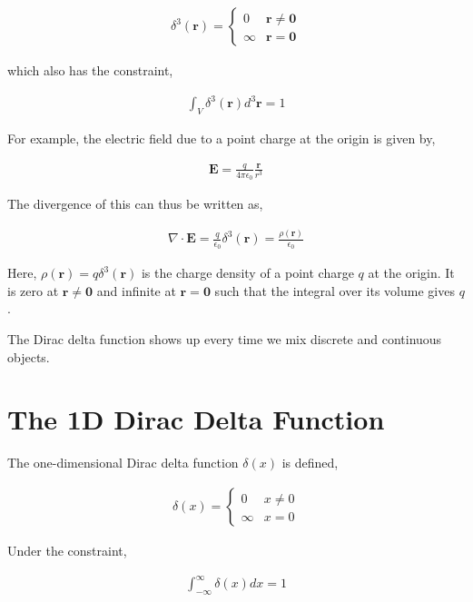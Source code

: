 \documentclass[11pt]{amsart}
\begin{document}
\begin{align*}
  \delta^3(\mathbf{r}) =
  \begin{cases}
    0 & \mathbf{r} \neq \mathbf{0} \\
    \infty & \mathbf{r} = \mathbf{0}
  \end{cases}
\end{align*}

which also has the constraint,

\begin{align*}
  \int_V \delta^3(\mathbf{r}) d^3\mathbf{r} = 1
\end{align*}

For example, the electric field due to a point charge at the origin is given by,

\begin{align*}
  \mathbf{E} = \frac{q}{4\pi\epsilon_0} \frac{\mathbf{r}}{r^3}
\end{align*}

The divergence of this can thus be written as,

\begin{align*}
  \nabla\cdot\mathbf{E} = \frac{q}{\epsilon_0}\delta^3(\mathbf{r}) = \frac{\rho(\mathbf{r})}{\epsilon_0}
\end{align*}

Here, $\rho(\mathbf{r}) = q\delta^3(\mathbf{r})$ is the charge density of a point charge $q$ at the origin. It is zero at $\mathbf{r} \neq \mathbf{0}$ and infinite at $\mathbf{r} = \mathbf{0}$ such that the integral over its volume gives $q$.

The Dirac delta function shows up every time we mix discrete and continuous objects.

\section{The 1D Dirac Delta Function}

The one-dimensional Dirac delta function $\delta(x)$ is defined,

\begin{align*}
  \delta(x) =
  \begin{cases}
    0 & x \neq 0 \\
    \infty & x = 0
  \end{cases}
\end{align*}

Under the constraint,

\begin{align*}
  \int_{-\infty}^{\infty} \delta(x) dx = 1
\end{align*}
\end{document}
